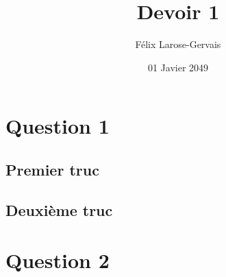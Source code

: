 \documentclass{article}
\title{Devoir 1}
\author{Félix Larose-Gervais}
\date{01 Javier 2049}
\begin{document}
\begin{titlepage}
\maketitle
\thispagestyle{empty}
\end{titlepage}

\section{Question 1}

\subsection{Premier truc}

\subsection{Deuxième truc}

\newpage

\section{Question 2}
\end{document}
